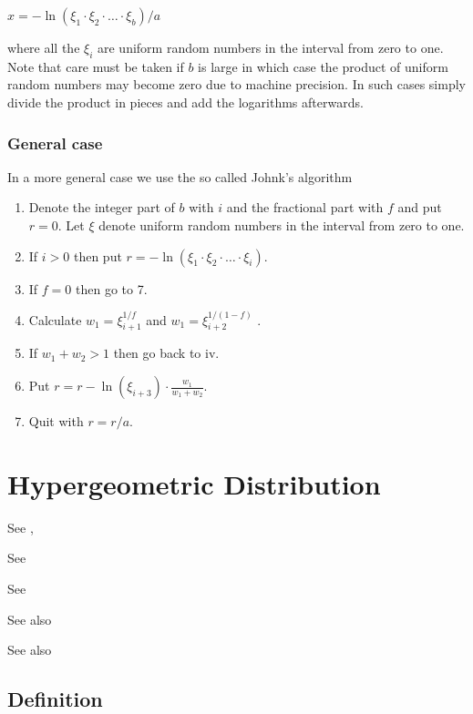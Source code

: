 $x = - \ln(\xi_1 \cdot \xi_2 \cdot \ldots \cdot \xi_b)/a$

where all the $\xi_i$ are uniform random numbers in the interval from zero to one. Note that
care must be taken if $b$ is large in which case the product of uniform random numbers may
become zero due to machine precision. In such cases simply divide the product in pieces
and add the logarithms afterwards.

\subsubsection{General case}
In a more general case we use the so called Johnk's algorithm

\begin{enumerate}
	\item Denote the integer part of $b$ with $i$ and the fractional part with $f$ and put $r = 0$. Let $\xi$ denote uniform random numbers in the interval from zero to one.
	\item If $i > 0$ then put $r = - \ln(\xi_1 \cdot \xi_2 \cdot \ldots \cdot \xi_i)$.
	\item If $f = 0$ then go to 7.
	\item Calculate $w_1 = \xi_{i+1}^{1/f}$ and $w_1 = \xi_{i+2}^{1/(1-f)}$ .
	\item If $w_1 + w_2 > 1$ then go back to iv.
	\item Put $r = r - \ln(\xi_{i+3}) \cdot \frac{w_1}{w_1+w_2}$.
	\item Quit with $r = r/a$.
\end{enumerate}





\newpage
\section{Hypergeometric Distribution}
\label{HypergeometricDistribution}


See \cite{Upton_1982}, \cite{Harkness_1964}

See \cite{ling_accuracy_1984}

See \cite{Knüsel_1987}

See also \cite{Conlon_1993}

See also \cite{Casagrande_1978}

\subsection{Definition}
\label{HypergeometricDistributionDefinition}

